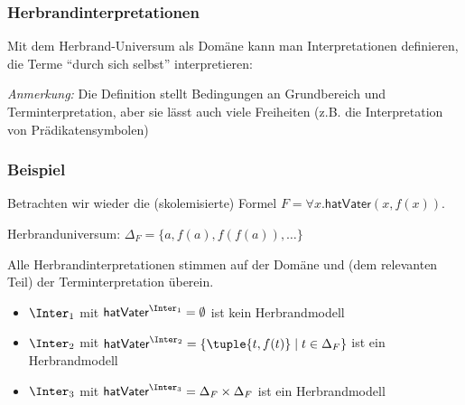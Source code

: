 \documentclass[aspectratio=1610,onlymath]{beamer}
\begin{document}
\begin{frame}\frametitle{Herbrandinterpretationen}

Mit dem Herbrand-Universum als Domäne kann man Interpretationen definieren, die Terme "`durch sich selbst"' interpretieren:\medskip


\emph{Anmerkung:} Die Definition stellt Bedingungen an Grundbereich und Terminterpretation, aber sie lässt auch viele Freiheiten (z.B. die Interpretation von Prädikatensymbolen)

\end{frame}

\begin{frame}\frametitle{Beispiel}

Betrachten wir wieder die (skolemisierte) Formel $F=\forall x.\textsf{hatVater}(x,f(x))$.\bigskip

Herbranduniversum: $\Delta_F=\{a,f(a),f(f(a)),\ldots\}$\medskip

Alle Herbrandinterpretationen stimmen auf der Domäne und (dem relevanten Teil) der Terminterpretation überein.
\begin{itemize}
\item $\Inter_1$ mit $\textsf{hatVater}^{\Inter_1}=\emptyset$ ist kein Herbrandmodell
\item $\Inter_2$ mit $\textsf{hatVater}^{\Inter_2}=\{\tuple{t,f(t)}\mid t\in\Delta_F\}$ ist ein Herbrandmodell
\item $\Inter_3$ mit $\textsf{hatVater}^{\Inter_3}=\Delta_F\times\Delta_F$ ist ein Herbrandmodell
\end{itemize}

\end{frame}
\end{document}
